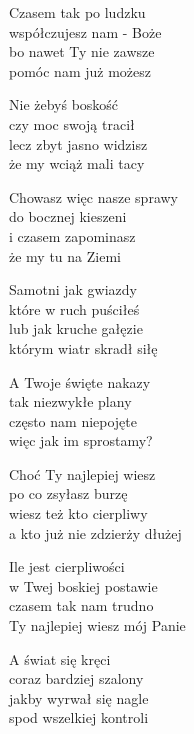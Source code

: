\begin{text}
    Czasem tak po ludzku\\
    współczujesz nam - Boże\\
    bo nawet Ty nie zawsze\\
    pomóc nam już możesz

    Nie żebyś boskość\\
    czy moc swoją tracił\\
    lecz zbyt jasno widzisz\\
    że my wciąż mali tacy

    \vin Chowasz więc nasze sprawy\\
    \vin do bocznej kieszeni\\
    \vin i czasem zapominasz\\
    \vin że my tu na Ziemi

    Samotni jak gwiazdy\\
    które w ruch puściłeś\\
    lub jak kruche gałęzie\\
    którym wiatr skradł siłę

    \vin A Twoje święte nakazy\\
    \vin tak niezwykłe plany\\
    \vin często nam niepojęte\\
    \vin więc jak im sprostamy?

    Choć Ty najlepiej wiesz\\
    po co zsyłasz burzę\\
    wiesz też kto cierpliwy\\
    a kto już nie zdzierży dłużej

    Ile jest cierpliwości\\
    w Twej boskiej postawie\\
    czasem tak nam trudno\\
    Ty najlepiej wiesz mój Panie

    \vin A świat się kręci\\
    \vin coraz bardziej szalony\\
    \vin jakby wyrwał się nagle\\
    \vin spod wszelkiej kontroli
\end{text}
\begin{chord}

\end{chord}